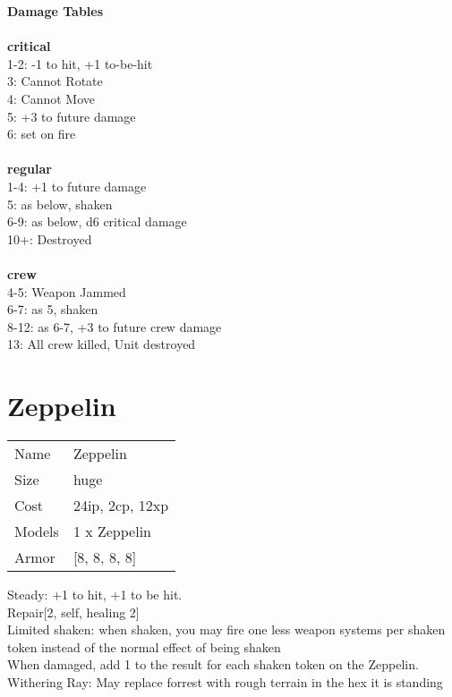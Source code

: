 {\bf Damage Tables} \\
\ \\ {\bf critical } \\
1-2: -1 to hit, +1 to-be-hit \\
3: Cannot Rotate \\
4: Cannot Move \\
5: +3 to future damage \\
6: set on fire \\
\ \\ {\bf regular } \\
1-4: +1 to future damage \\
5: as below, shaken \\
6-9: as below, d6 critical damage \\
10+: Destroyed \\
\ \\ {\bf crew } \\
4-5: Weapon Jammed \\
6-7: as 5, shaken \\
8-12: as 6-7, +3 to future crew damage \\
13: All crew killed, Unit destroyed \\










\pagebreak\pagebreak

\section{ Zeppelin }

\begin{tabular}{ll}
  Name & Zeppelin \\
  Size & huge\\
  Cost & 24ip, 2cp, 12xp\\
  Models & 1 x Zeppelin\\
  Armor & [8, 8, 8, 8]\\
\end{tabular}

\noindent Steady: +1 to hit, +1 to be hit.\\ 
Repair[2, self, healing 2]\\ 
Limited shaken: when shaken, you may fire one less weapon systems per shaken token instead of the normal effect of being shaken\\ 
 When damaged, add 1 to the result for each shaken token on the Zeppelin.\\ 
Withering Ray: May replace forrest with rough terrain in the hex it is standing\\ 


